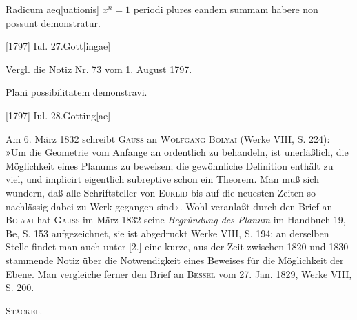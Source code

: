 \clearpage{}
\indent Radicum aeq[uationis] \(x^n=1\) periodi plures eandem summam habere non possunt demonstratur.
\par\noindent\hfill[1797] Iul. 27.\quad Gott[ingae]

\medskip\begingroup\small
\indent Vergl. die Notiz Nr. 73 vom 1. August 1797.
\par\endgroup

\indent Plani possibilitatem demonstravi.
\par\noindent\hfill[1797] Iul. 28.\quad Gotting[ae]

\medskip\begingroup\small
\indent Am 6. März 1832 schreibt \textsc{Gauss} an \textsc{Wolfgang Bolyai} (Werke VIII, S. 224): »Um die Geometrie vom Anfange an ordentlich zu behandeln, ist unerläßlich, die Möglichkeit eines Planums zu beweisen; die gewöhnliche Definition enthält zu viel, und implicirt eigentlich subreptive schon ein Theorem. Man muß sich wundern, daß alle Schriftsteller von \textsc{Euklid} bis auf die neuesten Zeiten so nachlässig dabei zu Werk gegangen sind«. Wohl veranlaßt durch den Brief an \textsc{Bolyai} hat \textsc{Gauss} im März 1832 seine \textit{Begründung des Planum} im Handbuch 19, Be, S. 153 aufgezeichnet, sie ist abgedruckt Werke VIII, S. 194; an derselben Stelle findet man auch unter [2.] eine kurze, aus der Zeit zwischen 1820 und 1830 stammende Notiz über die Notwendigkeit eines Beweises für die Möglichkeit der Ebene. Man vergleiche ferner den Brief an \textsc{Bessel} vom 27. Jan. 1829, Werke VIII, S. 200.
\par\noindent\hfill\textsc{Stäckel.}
\par\endgroup
